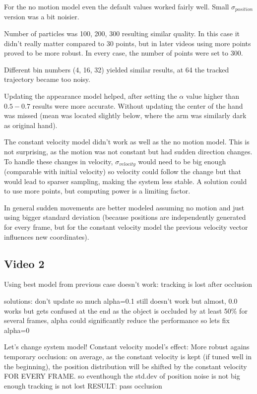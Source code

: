 \documentclass[10pt,a4paper,twoside]{article}
\begin{document}
For the no motion model even the default values worked fairly well. Small
$\sigma_{position}$ version was a bit noisier. 

Number of particles was 100, 200, 300 resulting similar quality. In this case it
didn't really matter compared to 30 points, but in later videos using more
points proved to be more robust. In every case, the number of points were set to 300.

Different bin numbers (4, 16, 32) yielded similar results, at 64 the tracked trajectory became too noisy.

Updating the appearance model helped, after setting the $\alpha$ value higher
than $0.5-0.7$ results were more accurate. Without updating the center of the
hand was missed (mean was located slightly below, where the arm was similarly
dark as original hand).

The constant velocity model didn't work as well as the no motion model. This is
not surprising, as the motion was not constant but had sudden direction changes.
To handle these changes in velocity, $\sigma_{velocity}$ would need
to be big enough (comparable with initial velocity) so velocity could follow the
change but that would lead to sparser sampling, making the system less stable. A
solution could to use more points, but computing power is a limiting factor.

In general sudden movements are better modeled assuming no motion and just using
bigger standard deviation (because positions are independently generated for
every frame, but for the constant velocity model the previous velocity vector influences new coordinates).

\subsection{Video 2}

Using best model from previous case doesn't work: tracking is lost after occlusion

solutions:
don't update so much alpha=0.1 still doesn't work but almost, 0.0 works but gets confused at the end
as the object is occluded by at least 50\% for several frames, alpha could significantly reduce the performance
so lets fix alpha=0

Let's change system model!
Constant velocity model's effect:
More robust agains temporary occlusion: on average, as the constant velocity is
kept (if tuned well in the beginning), the position distribution will be shifted
by the constant velocity FOR EVERY FRAME. so eventhough the std.dev of position
noise is not big enough tracking is not lost
RESULT: pass occlusion
\end{document}
